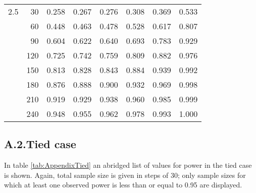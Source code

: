 \documentclass[bimj,fleqn]{w-art}\usepackage[]{graphicx}\usepackage[]{color}
\theoremstyle{plain}
\theoremstyle{definition}
\begin{document}
\begin{table}[ht]
\begin{tabular}{lrrrrrrr}
  2.5 & 30 & 0.258 & 0.267 & 0.276 & 0.308 & 0.369 & 0.533 \\ 
   & 60 & 0.448 & 0.463 & 0.478 & 0.528 & 0.617 & 0.807 \\ 
   & 90 & 0.604 & 0.622 & 0.640 & 0.693 & 0.783 & 0.929 \\ 
   & 120 & 0.725 & 0.742 & 0.759 & 0.809 & 0.882 & 0.976 \\ 
   & 150 & 0.813 & 0.828 & 0.843 & 0.884 & 0.939 & 0.992 \\ 
   & 180 & 0.876 & 0.888 & 0.900 & 0.932 & 0.969 & 0.998 \\ 
   & 210 & 0.919 & 0.929 & 0.938 & 0.960 & 0.985 & 0.999 \\ 
   & 240 & 0.948 & 0.955 & 0.962 & 0.978 & 0.993 & 1.000 \\ 
   \hline
\end{tabular}
\end{table}

\subsection*{A.2.\enspace Tied case}
In table \ref{tab:AppendixTied} an abridged list of values for power in the tied
case is shown. Again, total sample size is given in steps of 30; only sample
sizes for which at least one observed power is less than or equal to 0.95 are
displayed.
\end{document}
